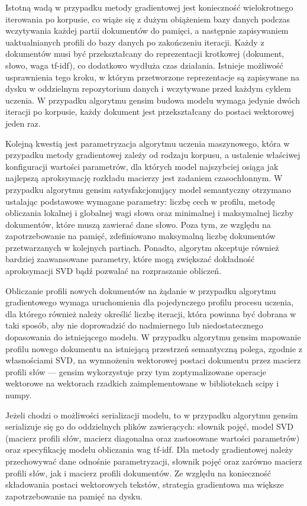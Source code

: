 \documentclass{pracamgr}
\begin{document}
Istotną wadą w przypadku metody gradientowej jest konieczność wielokrotnego iterowania po korpusie, co wiąże się z dużym obiążeniem bazy danych podczas wczytywania każdej partii dokumentów do pamięci, a następnie zapisywaniem uaktualnianych profili do bazy danych po zakończeniu iteracji. Każdy z dokumentów musi być przekształcany do reprezentacji krotkowej (dokument, słowo, waga tf-idf), co dodatkowo wydłuża czas działania. Istnieje możliwość usprawnienia tego kroku, w którym przetworzone reprezentacje są zapisywane na dysku w oddzielnym repozytorium danych i wczytywane przed każdym cyklem uczenia. W przypadku algorytmu gensim budowa modelu wymaga jedynie dwóch iteracji po korpusie, każdy dokument jest przekształcany do postaci wektorowej jeden raz. 

Kolejną kwestią jest parametryzacja algorytmu uczenia maszynowego, która w przypadku metody gradientowej zależy od rodzaju korpusu, a ustalenie właściwej konfiguracji wartości parametrów, dla których model najszybciej osiąga jak najlepszą aproksymację rozkładu macierzy jest zadaniem czasochłonnym. W przypadku algorytmu gensim satysfakcjonujący model semantyczny otrzymano ustalając podstawowe wymagane parametry: liczbę cech w profilu, metodę obliczania lokalnej i globalnej wagi słowa oraz minimalnej i maksymalnej liczby dokumentów, które muszą zawierać dane słowo. Poza tym, ze względu na zapotrzebowanie na pamięć, zdefiniowano maksymalną liczbę dokumentów przetwarzanych w kolejnych partiach. Ponadto, algorytm akceptuje również bardziej zaawansowane parametry, które mogą zwiększać dokładność aproksymacji SVD bądź pozwalać na rozpraszanie obliczeń.

Obliczanie profili nowych dokumentów na żądanie w przypadku algorytmu gradientowego wymaga uruchomienia dla pojedynczego profilu procesu uczenia, dla którego również należy określić liczbę iteracji, która powinna być dobrana w taki sposób, aby nie doprowadzić do nadmiernego lub niedostatecznego dopasowania do istniejącego modelu. W przypadku algorytmu gensim mapowanie profilu nowego dokumentu na istniejącą przestrzeń semantyczną polega, zgodnie z własnościami SVD, na wymnożeniu wektorowej postaci dokumentu przez macierz profili słów --- gensim wykorzystuje przy tym zoptymalizowane operacje wektorowe na wektorach rzadkich zaimplementowane w bibliotekach scipy i numpy.

Jeżeli chodzi o możliwości serializacji modelu, to w przypadku algorytmu gensim serializuje się go do oddzielnych plików zawierących: słownik pojęć, model SVD (macierz profili słów, macierz diagonalna oraz zastosowane wartości parametrów) oraz specyfikację modelu obliczania wag tf-idf. Dla metody gradientowej należy przechowywać dane odnośnie parametryzacji, słownik pojęć oraz zarówno macierz profili słów, jak i macierz profili dokumentów. Ze względu na konieczność składowania postaci wektorowych tekstów, strategia gradientowa ma większe zapotrzebowanie na pamięć na dysku.
\end{document}
